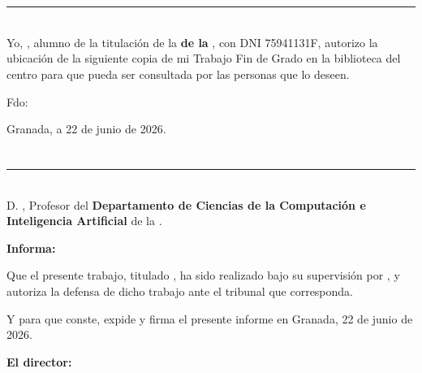 \chapter*{}
\thispagestyle{empty}

\noindent\rule[-1ex]{\textwidth}{2pt}\\[4.5ex]

Yo, \textbf{\myName}, alumno de la titulación \myDegree de la \textbf{\myFaculty de la \myUni}, con DNI 75941131F, autorizo la ubicación de la siguiente copia de mi Trabajo Fin de Grado en la biblioteca del centro para que pueda ser consultada por las personas que lo deseen.

\vspace{6cm}

\noindent Fdo: \myName

\vspace{2cm}

\begin{flushright}
       Granada, a 22 de junio de 2026.
\end{flushright}

\chapter*{}
\thispagestyle{empty}

\noindent\rule[-1ex]{\textwidth}{2pt}\\[4.5ex]

D. \textbf{\myProf}, Profesor del \textbf{Departamento de Ciencias de la Computación e Inteligencia Artificial} de la \textbf{\myUni}.

\vspace{0.5cm}

\textbf{Informa:}

\vspace{0.5cm}

Que el presente trabajo, titulado \textit{\textbf{\myTitle}}, ha sido realizado bajo su supervisión por \textbf{\myName}, y autoriza la defensa de dicho trabajo ante el tribunal que corresponda.

\vspace{0.5cm}

Y para que conste, expide y firma el presente informe en Granada, 22 de junio de 2026.

\vspace{1cm}

\textbf{El director:}

\vspace{5cm}

